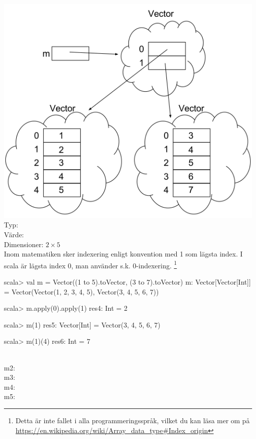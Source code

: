 \SubtaskSolved   \includegraphics{../img/w09-solutions/1a} \\
Typ: \\
Värde:  \\
Dimensioner: $2 \times 5$\\
Inom matematiken sker indexering enligt konvention med 1 som lägsta index. I scala är lägsta index 0, man använder s.k. 0-indexering. \footnote{Detta är inte fallet i alla programmeringsspråk, vilket du kan läsa mer om på \url{https://en.wikipedia.org/wiki/Array\_data\_type\#Index\_origin}}

\SubtaskSolved
\begin{REPL}
scala> val m = Vector((1 to 5).toVector, (3 to 7).toVector)
m: Vector[Vector[Int]] = Vector(Vector(1, 2, 3, 4, 5), Vector(3, 4, 5, 6, 7))

scala> m.apply(0).apply(1)
res4: Int = 2

scala> m(1)
res5: Vector[Int] = Vector(3, 4, 5, 6, 7)

scala> m(1)(4)
res6: Int = 7
\end{REPL}

\SubtaskSolved  \\
m2: \\
m3: \\
m4: \\
m5: 

